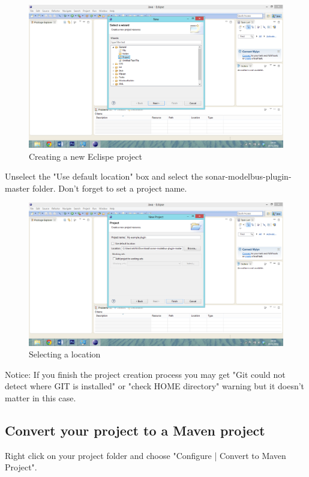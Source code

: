 \begin{figure}[h]
	\centering
		\includegraphics[width=\textwidth]{neweclipseproject}
	\caption{Creating a new Eclispe project}
	\label{fig:neweclipseproject}
\end{figure}

Unselect the "Use default location" box and select the sonar-modelbus-plugin-master folder. Don't forget to set a project name.
 
\begin{figure}[h]
	\centering
		\includegraphics[width=\textwidth]{selectlocation}
	\caption{Selecting a location}
	\label{fig:selectlocation}
\end{figure}

Notice: If you finish the project creation process you may get
"Git could not detect where GIT is installed" or "check HOME directory" warning but it doesn't matter in this case.



\subsection{Convert your project to a Maven project}
Right click on your project folder and choose "Configure | Convert to Maven Project".
 
